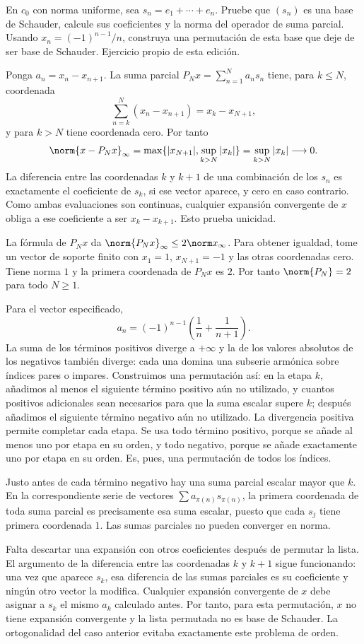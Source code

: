 \begin{ejercicio}\label{ej:ampl-schauder-5}
En $c_0$ con norma uniforme, sea $s_n=e_1+\cdots+e_n$. Pruebe que $(s_n)$ es una base de Schauder, calcule sus coeficientes y la norma del operador de suma parcial. Usando $x_n=(-1)^{n-1}/n$, construya una permutación de esta base que deje de ser base de Schauder. Ejercicio propio de esta edición.
\end{ejercicio}
\begin{solucion}
Ponga $a_n=x_n-x_{n+1}$. La suma parcial $P_Nx=\sum_{n=1}^Na_ns_n$ tiene, para $k\le N$, coordenada
\[
 \sum_{n=k}^N(x_n-x_{n+1})=x_k-x_{N+1},
\]
y para $k>N$ tiene coordenada cero. Por tanto
\[
 \norm{x-P_Nx}_\infty
 =\max\{|x_{N+1}|,\sup_{k>N}|x_k|\}
 =\sup_{k>N}|x_k|\longrightarrow0.
\]
La diferencia entre las coordenadas $k$ y $k+1$ de una combinación de los $s_n$ es exactamente el coeficiente de $s_k$, si ese vector aparece, y cero en caso contrario. Como ambas evaluaciones son continuas, cualquier expansión convergente de $x$ obliga a ese coeficiente a ser $x_k-x_{k+1}$. Esto prueba unicidad.

La fórmula de $P_Nx$ da $\norm{P_Nx}_\infty\le2\norm x_\infty$. Para obtener igualdad, tome un vector de soporte finito con $x_1=1$, $x_{N+1}=-1$ y las otras coordenadas cero. Tiene norma $1$ y la primera coordenada de $P_Nx$ es $2$. Por tanto $\norm{P_N}=2$ para todo $N\ge1$.

Para el vector especificado,
\[
 a_n=(-1)^{n-1}\left(\frac1n+\frac1{n+1}\right).
\]
La suma de los términos positivos diverge a $+\infty$ y la de los valores absolutos de los negativos también diverge: cada una domina una subserie armónica sobre índices pares o impares. Construimos una permutación así: en la etapa $k$, añadimos al menos el siguiente término positivo aún no utilizado, y cuantos positivos adicionales sean necesarios para que la suma escalar supere $k$; después añadimos el siguiente término negativo aún no utilizado. La divergencia positiva permite completar cada etapa. Se usa todo término positivo, porque se añade al menos uno por etapa en su orden, y todo negativo, porque se añade exactamente uno por etapa en su orden. Es, pues, una permutación de todos los índices.

Justo antes de cada término negativo hay una suma parcial escalar mayor que $k$. En la correspondiente serie de vectores $\sum a_{\pi(n)}s_{\pi(n)}$, la primera coordenada de toda suma parcial es precisamente esa suma escalar, puesto que cada $s_j$ tiene primera coordenada $1$. Las sumas parciales no pueden converger en norma.

Falta descartar una expansión con otros coeficientes después de permutar la lista. El argumento de la diferencia entre las coordenadas $k$ y $k+1$ sigue funcionando: una vez que aparece $s_k$, esa diferencia de las sumas parciales es su coeficiente y ningún otro vector la modifica. Cualquier expansión convergente de $x$ debe asignar a $s_k$ el mismo $a_k$ calculado antes. Por tanto, para esta permutación, $x$ no tiene expansión convergente y la lista permutada no es base de Schauder. La ortogonalidad del caso anterior evitaba exactamente este problema de orden.
\end{solucion}


